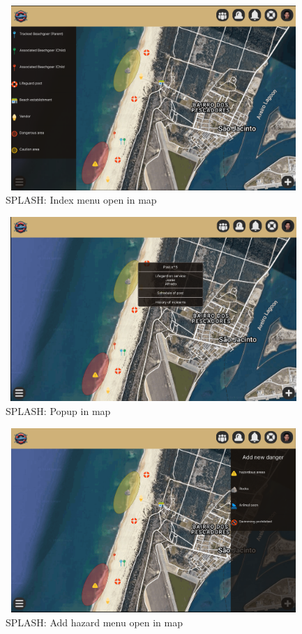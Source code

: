 \begin{figure}[H]
      \centering
      \includegraphics[width=13cm,height=7cm]{figs/Mockups/MAP_index.png}
      \caption{SPLASH: Index menu open in map}
      \label{fig:Login}
\end{figure}

\begin{figure}[H]
      \centering
      \includegraphics[width=13cm,height=7cm]{figs/Mockups/MAP_popup.png}
      \caption{SPLASH: Popup in map}
      \label{fig:Login}
\end{figure}

\begin{figure}[H]
      \centering
      \includegraphics[width=13cm,height=7cm]{figs/Mockups/MAP_add1.png}
      \caption{SPLASH: Add hazard menu open in map}
      \label{fig:Login}
\end{figure}

